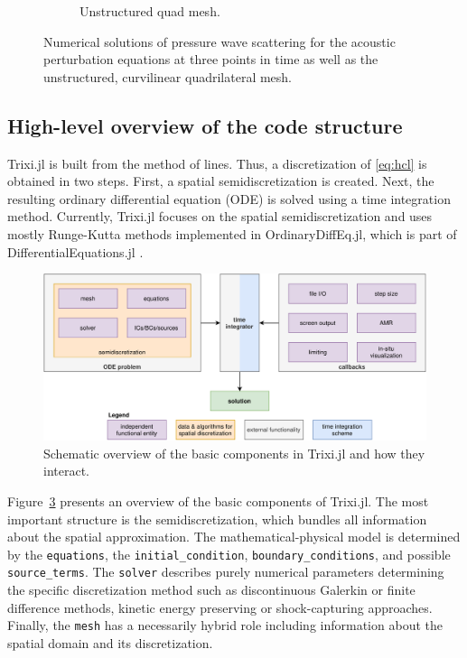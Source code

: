 \documentclass[hidelinks]{juliacon} %
\newcommand{\trixi}{Trixi.jl\xspace}
\begin{document}
\begin{figure}[!h]
\begin{subfigure}{0.46\linewidth}
    \caption{Unstructured quad mesh.}
    \label{fig:ginger_mesh}
  \end{subfigure}%
  \caption{Numerical solutions of pressure wave scattering for the acoustic
                perturbation equations at three points in time as well as the unstructured,
                curvilinear quadrilateral mesh.}
  \label{fig:pressure_waves}
\end{figure}


\subsection{High-level overview of the code structure}

\trixi is built from the method of lines. Thus, a discretization of \eqref{eq:hcl}
is obtained in two steps. First, a spatial semidiscretization is created. Next,
the resulting ordinary differential equation (ODE) is solved using a time
integration method. Currently, \trixi focuses on the spatial semidiscretization
and uses mostly Runge-Kutta methods implemented in OrdinaryDiffEq.jl, which is part
of DifferentialEquations.jl \cite{rackauckas2017differentialequations}.

\begin{figure}[htbp]
\centering
  \includegraphics[width=0.9\linewidth]{../figures/trixi_global_overview}
  \caption{Schematic overview of the basic components in \trixi and how they
           interact.}
  \label{fig:trixi_global_overview}
\end{figure}

Figure~\ref{fig:trixi_global_overview} presents an overview of the basic
components of \trixi. The most important structure is the semidiscretization,
which bundles all information about the spatial approximation. The mathematical-physical
model is determined by the \lstinline{equations}, the \lstinline{initial_condition},
\lstinline{boundary_conditions}, and possible \lstinline{source_terms}. The
\lstinline{solver} describes purely numerical parameters determining the specific
discretization method such as discontinuous Galerkin or finite difference
methods, kinetic energy preserving or shock-capturing approaches. Finally, the
\lstinline{mesh} has a necessarily hybrid role including information about the
spatial domain and its discretization.
\end{document}
